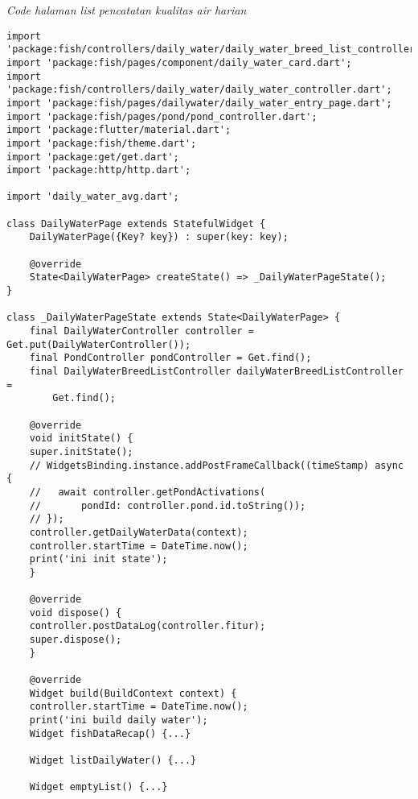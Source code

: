 	\textit{Code halaman list pencatatan kualitas air harian}
	\begin{lstlisting}
import 'package:fish/controllers/daily_water/daily_water_breed_list_controller.dart';
import 'package:fish/pages/component/daily_water_card.dart';
import 'package:fish/controllers/daily_water/daily_water_controller.dart';
import 'package:fish/pages/dailywater/daily_water_entry_page.dart';
import 'package:fish/pages/pond/pond_controller.dart';
import 'package:flutter/material.dart';
import 'package:fish/theme.dart';
import 'package:get/get.dart';
import 'package:http/http.dart';

import 'daily_water_avg.dart';

class DailyWaterPage extends StatefulWidget {
    DailyWaterPage({Key? key}) : super(key: key);

    @override
    State<DailyWaterPage> createState() => _DailyWaterPageState();
}

class _DailyWaterPageState extends State<DailyWaterPage> {
    final DailyWaterController controller = Get.put(DailyWaterController());
    final PondController pondController = Get.find();
    final DailyWaterBreedListController dailyWaterBreedListController =
        Get.find();

    @override
    void initState() {
    super.initState();
    // WidgetsBinding.instance.addPostFrameCallback((timeStamp) async {
    //   await controller.getPondActivations(
    //       pondId: controller.pond.id.toString());
    // });
    controller.getDailyWaterData(context);
    controller.startTime = DateTime.now();
    print('ini init state');
    }

    @override
    void dispose() {
    controller.postDataLog(controller.fitur);
    super.dispose();
    }

    @override
    Widget build(BuildContext context) {
    controller.startTime = DateTime.now();
    print('ini build daily water');
    Widget fishDataRecap() {...}

    Widget listDailyWater() {...}

    Widget emptyList() {...}


\end{lstlisting}
